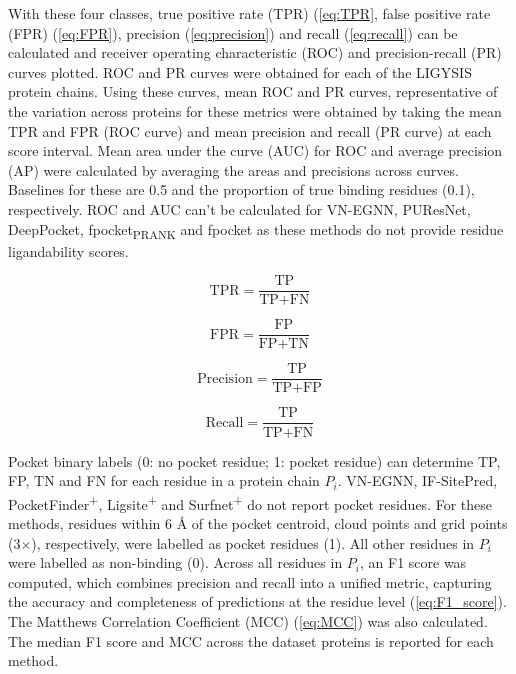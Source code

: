 With these four classes, true positive rate (TPR) (\autoref{eq:TPR}, false positive rate (FPR) (\autoref{eq:FPR}), precision (\autoref{eq:precision}) and recall (\autoref{eq:recall}) can be calculated and receiver operating characteristic (ROC) and precision-recall (PR) curves plotted. ROC and PR curves were obtained for each of the LIGYSIS protein chains. Using these curves, mean ROC and PR curves, representative of the variation across proteins for these metrics were obtained by taking the mean TPR and FPR (ROC curve) and mean precision and recall (PR curve) at each score interval. Mean area under the curve (AUC) for ROC and average precision (AP) were calculated by averaging the areas and precisions across curves. Baselines for these are 0.5 and the proportion of true binding residues (0.1), respectively. ROC and AUC can't be calculated for VN-EGNN, PUResNet, DeepPocket, fpocket\textsubscript{PRANK} and fpocket as these methods do not provide residue ligandability scores.

\begin{equation}
\text{TPR} = \frac{\text{TP}}{\text{TP} + \text{FN}}
\label{eq:TPR}
\end{equation}

\begin{equation}
\text{FPR} = \frac{\text{FP}}{\text{FP} + \text{TN}}
\label{eq:FPR}
\end{equation}

\begin{equation}
\text{Precision} = \frac{\text{TP}}{\text{TP} + \text{FP}}
\label{eq:precision}
\end{equation}

\begin{equation}
\text{Recall} = \frac{\text{TP}}{\text{TP} + \text{FN}}
\label{eq:recall}
\end{equation}

Pocket binary labels (0: no pocket residue; 1: pocket residue) can determine TP, FP, TN and FN for each residue in a protein chain $P_i$. VN-EGNN, IF-SitePred, PocketFinder\textsuperscript{+}, Ligsite\textsuperscript{+} and Surfnet\textsuperscript{+} do not report pocket residues. For these methods, residues within 6 \AA{} of the pocket centroid, cloud points and grid points (3$\times$), respectively, were labelled as pocket residues (1). All other residues in $P_i$ were labelled as non-binding (0). Across all residues in $P_i$, an F1 score was computed, which combines precision and recall into a unified metric, capturing the accuracy and completeness of predictions at the residue level (\autoref{eq:F1_score}). The Matthews Correlation Coefficient (MCC) \cite{MATTHEWS_1975_MCC} (\autoref{eq:MCC}) was also calculated. The median F1 score and MCC across the dataset proteins is reported for each method.

